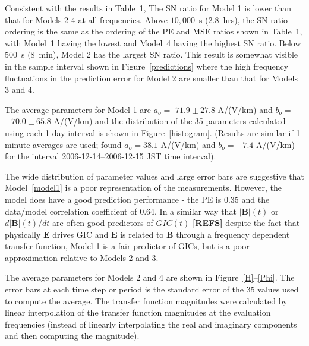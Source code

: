 \documentclass[draft,linenumbers]{agujournal2018}
\begin{document}
Consistent with the results in Table~1, The SN ratio for Model 1 is lower than that for Models 2-4 at all frequencies.  Above $10,000$~s (2.8~hrs), the SN ratio ordering is the same as the ordering of the PE and MSE ratios shown in Table~1, with Model~1 having the lowest and Model~4 having the highest SN ratio. Below $500$~s (8~min), Model 2 has the largest SN ratio. This result is somewhat visible in the sample interval shown in Figure~\ref{predictions} where the high frequency fluctuations in the prediction error for Model 2 are smaller than that for Models 3 and 4.

The average parameters for Model 1 are $a_o = $ $71.9 \pm 27.8$ A/(V/km) and $b_o =$ $-70.0 \pm 65.8$ A/(V/km) and the distribution of the 35 parameters calculated using each 1-day interval is shown in Figure~\ref{histogram}. (Results are similar if 1-minute averages are used; \cite{Watari2015} found  $a_o=38.1$ A/(V/km) and $b_o=-7.4$ A/(V/km) for the interval 2006-12-14--2006-12-15 JST time interval). 

The wide distribution of parameter values and large error bars are suggestive that Model~\ref{model1} is a poor representation of the measurements. However, the model does have a good prediction performance - the PE is 0.35 and the data/model correlation coefficient of 0.64. In a similar way that $|\mathbf{B}|(t)$ or $d|\mathbf{B}|(t)/dt$ are often good predictors of $GIC(t)$  {\color{red} \textbf{[REFS]}} despite the fact that physically $\mathbf{E}$ drives GIC and $\mathbf{E}$ is related to $\mathbf{B}$ through a frequency dependent transfer function, Model 1 is a fair predictor of GICs, but is a poor approximation relative to Models 2 and 3.


The average parameters for Models 2 and 4 are shown in Figure~\ref{H}--\ref{Phi}. The error bars at each time step or period is the standard error of the 35 values used to compute the average. The transfer function magnitudes were calculated by linear interpolation of the transfer function magnitudes at the evaluation frequencies (instead of linearly interpolating the real and imaginary components and then computing the magnitude).
\end{document}
